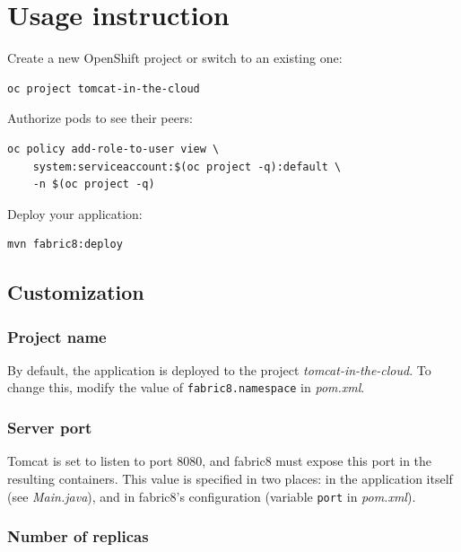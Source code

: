 \documentclass[11pt,a4paper]{article}
\begin{document}

\clearpage
\appendix
\section{Usage instruction}\label{sec:usage}

Create a new OpenShift project or switch to an existing one: \\
\begin{lstlisting}
oc project tomcat-in-the-cloud
\end{lstlisting}

Authorize pods to see their peers: \\
\begin{lstlisting}
oc policy add-role-to-user view \
    system:serviceaccount:$(oc project -q):default \
    -n $(oc project -q)
\end{lstlisting}

Deploy your application: \\
\begin{lstlisting}
mvn fabric8:deploy
\end{lstlisting}

\subsection*{Customization}

\subsubsection*{Project name}

By default, the application is deployed to the project \emph{tomcat-in-the-cloud}. To change this, modify the value of \texttt{fabric8.namespace} in \emph{pom.xml}.

\subsubsection*{Server port}

Tomcat is set to listen to port 8080, and fabric8 must expose this port in the resulting containers. This value is specified in two places: in the application itself (see \emph{Main.java}), and in fabric8's configuration (variable \texttt{port} in \emph{pom.xml}).

\subsubsection*{Number of replicas}
\end{document}
